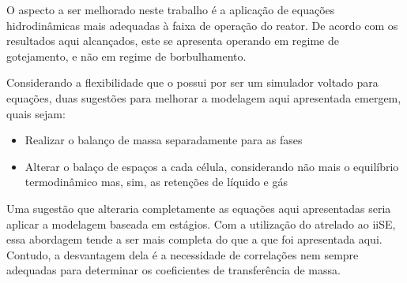 O aspecto a ser melhorado neste trabalho é a aplicação de equações
hidrodinâmicas mais adequadas à faixa de operação do reator. De acordo
com os resultados aqui alcançados, este se apresenta operando em regime de
gotejamento, e não em regime de borbulhamento.

Considerando a flexibilidade que o \emso{} possui por ser um simulador
voltado para equações, duas sugestões para melhorar a modelagem aqui apresentada
emergem, quais sejam:

\begin{itemize}
\item {Realizar o balanço de massa separadamente para as fases}
\item {Alterar o balaço de espaços a cada célula, considerando não mais o
equilíbrio termodinâmico mas, sim, as retenções de líquido e gás}
\end{itemize}

Uma sugestão que alteraria completamente as equações aqui apresentadas seria
aplicar a modelagem baseada em estágios. Com a utilização do \emso{} atrelado ao
iiSE, essa abordagem tende a ser mais completa do que a que foi apresentada
aqui. Contudo, a desvantagem dela é a necessidade de correlações nem sempre
adequadas para determinar os coeficientes de transferência de massa.

